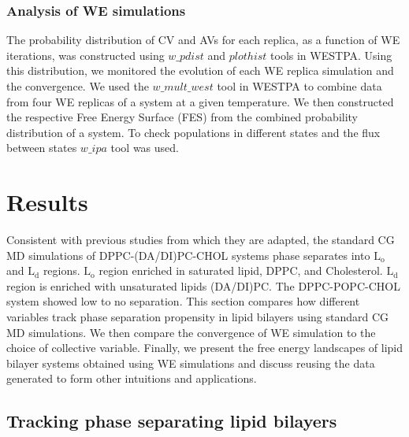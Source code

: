 \documentclass{biophys-new}
\begin{document}
\subsubsection*{Analysis of WE simulations}
The probability distribution of CV and AVs for each replica, as a function of WE iterations, was constructed using $w\_pdist$ and $plothist$ tools in WESTPA.
Using this distribution, we monitored the evolution of each WE replica simulation and the convergence.
We used the $w\_mult\_west$ tool in WESTPA to combine data from four WE replicas of a system at a given temperature.
We then constructed the respective Free Energy Surface (FES) from the combined probability distribution of a system.
To check populations in different states and the flux between states  $w\_ipa$ tool was used.

\section*{Results}

Consistent with previous studies from which they are adapted, the standard CG MD simulations of DPPC-(DA/DI)PC-CHOL systems phase separates into $\text{L}_{\text{o}}$ and $\text{L}_{\text{d}}$ regions.
$\text{L}_{\text{o}}$ region enriched in saturated lipid, DPPC, and Cholesterol. 
$\text{L}_{\text{d}}$ region is enriched with unsaturated lipids (DA/DI)PC.
The DPPC-POPC-CHOL system showed low to no separation.
This section compares how different variables track phase separation propensity in lipid bilayers using standard CG MD simulations.
We then compare the convergence of WE simulation to the choice of collective variable.
Finally, we present the free energy landscapes of lipid bilayer systems obtained using WE simulations and discuss reusing the data generated to form other intuitions and applications.

\subsection*{Tracking phase separating lipid bilayers}
\end{document}
